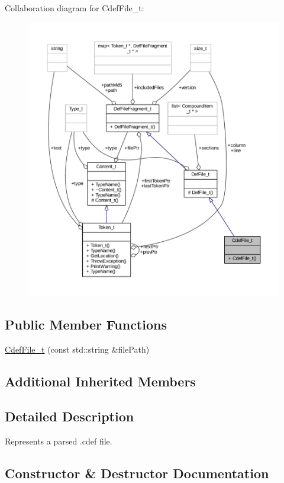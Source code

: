 Collaboration diagram for Cdef\+File\+\_\+t\+:
\nopagebreak
\begin{figure}[H]
\begin{center}
\leavevmode
\includegraphics[width=350pt]{struct_cdef_file__t__coll__graph}
\end{center}
\end{figure}
\subsection*{Public Member Functions}
\begin{DoxyCompactItemize}
\item 
\hyperlink{struct_cdef_file__t_acf1a882a0c480ab10a7a6c1c9468e091}{Cdef\+File\+\_\+t} (const std\+::string \&file\+Path)
\end{DoxyCompactItemize}
\subsection*{Additional Inherited Members}


\subsection{Detailed Description}
Represents a parsed .cdef file. 

\subsection{Constructor \& Destructor Documentation}
